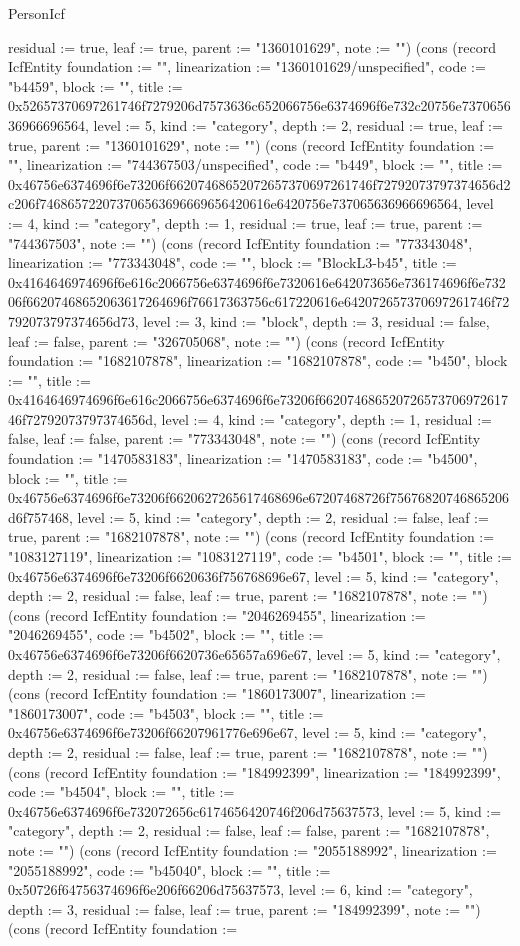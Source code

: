 \begin{lexlean}{PersonIcf}
\begin{semanticmodule}
{residual := true, leaf := true, parent := "1360101629", note := ""}) (cons (record IcfEntity {foundation := "", linearization := "1360101629/unspecified", code := "b4459", block := "", title := 0x52657370697261746f7279206d7573636c652066756e6374696f6e732c20756e737065636966696564, level := 5, kind := "category", depth := 2, residual := true, leaf := true, parent := "1360101629", note := ""}) (cons (record IcfEntity {foundation := "", linearization := "744367503/unspecified", code := "b449", block := "", title := 0x46756e6374696f6e73206f66207468652072657370697261746f72792073797374656d2c206f746865722073706563696669656420616e6420756e737065636966696564, level := 4, kind := "category", depth := 1, residual := true, leaf := true, parent := "744367503", note := ""}) (cons (record IcfEntity {foundation := "773343048", linearization := "773343048", code := "", block := "BlockL3-b45", title := 0x4164646974696f6e616c2066756e6374696f6e7320616e642073656e736174696f6e73206f66207468652063617264696f76617363756c617220616e642072657370697261746f72792073797374656d73, level := 3, kind := "block", depth := 3, residual := false, leaf := false, parent := "326705068", note := ""}) (cons (record IcfEntity {foundation := "1682107878", linearization := "1682107878", code := "b450", block := "", title := 0x4164646974696f6e616c2066756e6374696f6e73206f66207468652072657370697261746f72792073797374656d, level := 4, kind := "category", depth := 1, residual := false, leaf := false, parent := "773343048", note := ""}) (cons (record IcfEntity {foundation := "1470583183", linearization := "1470583183", code := "b4500", block := "", title := 0x46756e6374696f6e73206f6620627265617468696e67207468726f75676820746865206d6f757468, level := 5, kind := "category", depth := 2, residual := false, leaf := true, parent := "1682107878", note := ""}) (cons (record IcfEntity {foundation := "1083127119", linearization := "1083127119", code := "b4501", block := "", title := 0x46756e6374696f6e73206f6620636f756768696e67, level := 5, kind := "category", depth := 2, residual := false, leaf := true, parent := "1682107878", note := ""}) (cons (record IcfEntity {foundation := "2046269455", linearization := "2046269455", code := "b4502", block := "", title := 0x46756e6374696f6e73206f6620736e65657a696e67, level := 5, kind := "category", depth := 2, residual := false, leaf := true, parent := "1682107878", note := ""}) (cons (record IcfEntity {foundation := "1860173007", linearization := "1860173007", code := "b4503", block := "", title := 0x46756e6374696f6e73206f66207961776e696e67, level := 5, kind := "category", depth := 2, residual := false, leaf := true, parent := "1682107878", note := ""}) (cons (record IcfEntity {foundation := "184992399", linearization := "184992399", code := "b4504", block := "", title := 0x46756e6374696f6e732072656c6174656420746f206d75637573, level := 5, kind := "category", depth := 2, residual := false, leaf := false, parent := "1682107878", note := ""}) (cons (record IcfEntity {foundation := "2055188992", linearization := "2055188992", code := "b45040", block := "", title := 0x50726f64756374696f6e206f66206d75637573, level := 6, kind := "category", depth := 3, residual := false, leaf := true, parent := "184992399", note := ""}) (cons (record IcfEntity {foundation := }
\end{semanticmodule}
\end{lexlean}
